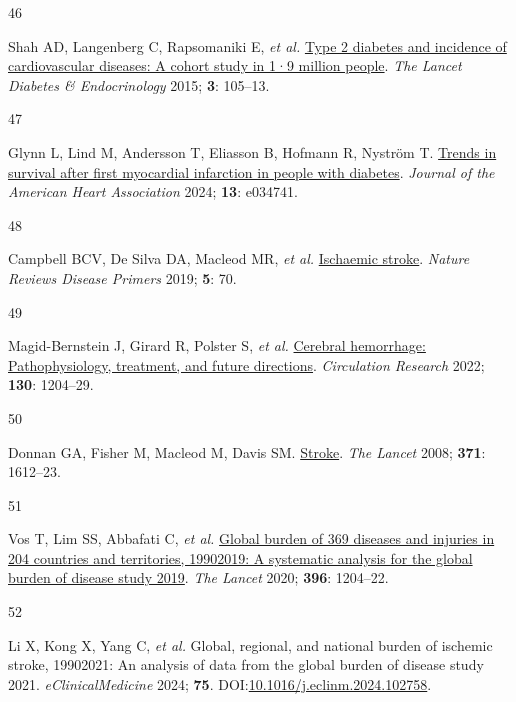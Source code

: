 \documentclass[
  letterpaper,
  headsepline=true,
  open=any]{scrbook}
\newlength{\cslhangindent}
\newlength{\csllabelwidth}
\newlength{\cslentryspacingunit} %
\newenvironment{CSLReferences}[2] %
 {%
  \setlength{\parindent}{0pt}
  \ifodd #1
  \let\oldpar\par
  \def\par{\hangindent=\cslhangindent\oldpar}
  \fi
  \setlength{\parskip}{#2\cslentryspacingunit}
 }%
 {}
\newcommand{\CSLLeftMargin}[1]{\parbox[t]{\csllabelwidth}{#1}}
\newcommand{\CSLRightInline}[1]{\parbox[t]{\linewidth - \csllabelwidth}{#1}\break}
\begin{document}
\begin{CSLReferences}{0}{0}
\leavevmode{}%
\CSLLeftMargin{46 }%
\CSLRightInline{Shah AD, Langenberg C, Rapsomaniki E, \emph{et al.}
\href{https://doi.org/10.1016/S2213-8587(14)70219-0}{Type 2 diabetes and
incidence of cardiovascular diseases: A cohort study in 1·9 million
people}. \emph{The Lancet Diabetes \& Endocrinology} 2015; \textbf{3}:
105--13.}

\leavevmode{}%
\CSLLeftMargin{47 }%
\CSLRightInline{Glynn L, Lind M, Andersson T, Eliasson B, Hofmann R,
Nyström T. \href{https://doi.org/10.1161/JAHA.123.034741}{Trends in
survival after first myocardial infarction in people with diabetes}.
\emph{Journal of the American Heart Association} 2024; \textbf{13}:
e034741.}

\leavevmode{}%
\CSLLeftMargin{48 }%
\CSLRightInline{Campbell BCV, De Silva DA, Macleod MR, \emph{et al.}
\href{https://doi.org/10.1038/s41572-019-0118-8}{Ischaemic stroke}.
\emph{Nature Reviews Disease Primers} 2019; \textbf{5}: 70.}

\leavevmode{}%
\CSLLeftMargin{49 }%
\CSLRightInline{Magid-Bernstein J, Girard R, Polster S, \emph{et al.}
\href{https://doi.org/10.1161/CIRCRESAHA.121.319949}{Cerebral
hemorrhage: Pathophysiology, treatment, and future directions}.
\emph{Circulation Research} 2022; \textbf{130}: 1204--29.}

\leavevmode{}%
\CSLLeftMargin{50 }%
\CSLRightInline{Donnan GA, Fisher M, Macleod M, Davis SM.
\href{https://doi.org/10.1016/S0140-6736(08)60694-7}{Stroke}. \emph{The
Lancet} 2008; \textbf{371}: 1612--23.}

\leavevmode{}%
\CSLLeftMargin{51 }%
\CSLRightInline{Vos T, Lim SS, Abbafati C, \emph{et al.}
\href{https://doi.org/10.1016/S0140-6736(20)30925-9}{Global burden of
369 diseases and injuries in 204 countries and territories,
1990{\textendash}2019: A systematic analysis for the global burden of
disease study 2019}. \emph{The Lancet} 2020; \textbf{396}: 1204--22.}

\leavevmode{}%
\CSLLeftMargin{52 }%
\CSLRightInline{Li X, Kong X, Yang C, \emph{et al.} Global, regional,
and national burden of ischemic stroke, 1990{\textendash}2021: An
analysis of data from the global burden of disease study 2021.
\emph{eClinicalMedicine} 2024; \textbf{75}.
DOI:\href{https://doi.org/10.1016/j.eclinm.2024.102758}{10.1016/j.eclinm.2024.102758}.}


\end{CSLReferences}
\end{document}

